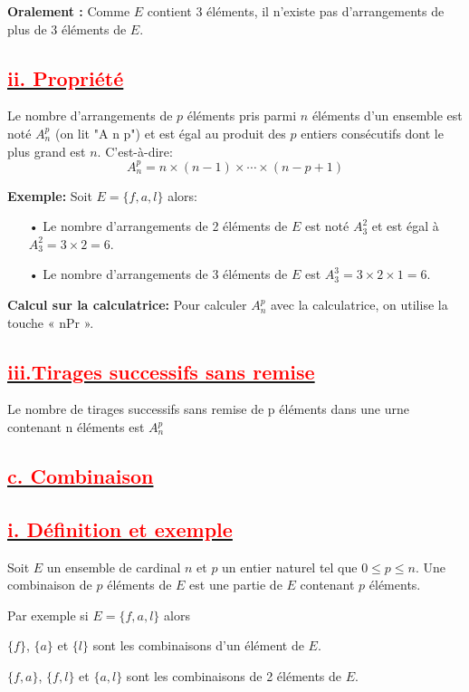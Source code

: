 \documentclass[12pt]{article}
\begin{document}
\textbf{Oralement :} Comme \( E \) contient 3 éléments, il n’existe pas d’arrangements de plus de 3 éléments de \( E \).
\subsection*{\underline{\textbf{\textcolor{red}{ii. Propriété}}}}
Le nombre d'arrangements de \( p \) éléments pris parmi \( n \) éléments d'un ensemble est noté \( A_n^p \) (on lit "A n p") et est égal au produit des \( p \) entiers consécutifs dont le plus grand est \( n \). C'est-à-dire:
\[
A_n^p = n \times (n-1) \times \cdots \times (n-p+1)
\]

\textbf{Exemple:}
Soit \( E = \{f, a, l\} \) alors:
\begin{itemize}
    \item[•] Le nombre d'arrangements de 2 éléments de \( E \) est noté \( A_3^2 \) et est égal à \( A_3^2 = 3 \times 2 = 6 \).
    \item[•] Le nombre d'arrangements de 3 éléments de \( E \) est \( A_3^3 = 3 \times 2 \times 1 = 6 \).
\end{itemize}

\textbf{Calcul sur la calculatrice:}
Pour calculer \( A_n^p \) avec la calculatrice, on utilise la touche « nPr ».
\subsection*{\underline{\textbf{\textcolor{red}{iii.Tirages successifs sans remise}}}}
Le nombre de tirages successifs sans remise de p éléments dans une urne contenant n 
éléments est $A_{n}^{p}$
\subsection*{\underline{\textbf{\textcolor{red}{c. Combinaison}}}}
\subsection*{\underline{\textbf{\textcolor{red}{i. Définition et exemple }}}}
Soit $E$ un ensemble de cardinal $n$ et $p$ un entier naturel tel que $0 \leq p \leq n$. Une combinaison de 
$p$ éléments de $E$ est une partie de $E$ contenant $p$ éléments.

Par exemple si $E = \{f, a, l\}$ alors

$\{f\}$, $\{a\}$ et $\{l\}$ sont les combinaisons d'un élément de $E$.

$\{f, a\}$, $\{f, l\}$ et $\{a, l\}$ sont les combinaisons de 2 éléments de $E$.
\end{document}
